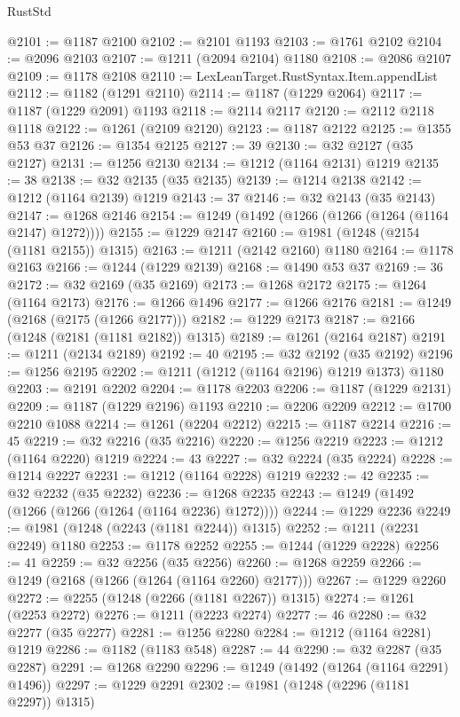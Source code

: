\begin{lexlean}{RustStd}
\begin{coremodule}
@2101 := @1187 @2100
@2102 := @2101 @1193
@2103 := @1761 @2102
@2104 := @2096 @2103
@2107 := @1211 (@2094 @2104) @1180
@2108 := @2086 @2107
@2109 := @1178 @2108
@2110 := LexLeanTarget.RustSyntax.Item.appendList
@2112 := @1182 (@1291 @2110)
@2114 := @1187 (@1229 @2064)
@2117 := @1187 (@1229 @2091) @1193
@2118 := @2114 @2117
@2120 := @2112 @2118 @1118
@2122 := @1261 (@2109 @2120)
@2123 := @1187 @2122
@2125 := @1355 @53 @37
@2126 := @1354 @2125
@2127 := 39
@2130 := @32 @2127 (@35 @2127)
@2131 := @1256 @2130
@2134 := @1212 (@1164 @2131) @1219
@2135 := 38
@2138 := @32 @2135 (@35 @2135)
@2139 := @1214 @2138
@2142 := @1212 (@1164 @2139) @1219
@2143 := 37
@2146 := @32 @2143 (@35 @2143)
@2147 := @1268 @2146
@2154 := @1249 (@1492 (@1266 (@1266 (@1264 (@1164 @2147) @1272))))
@2155 := @1229 @2147
@2160 := @1981 (@1248 (@2154 (@1181 @2155)) @1315)
@2163 := @1211 (@2142 @2160) @1180
@2164 := @1178 @2163
@2166 := @1244 (@1229 @2139)
@2168 := @1490 @53 @37
@2169 := 36
@2172 := @32 @2169 (@35 @2169)
@2173 := @1268 @2172
@2175 := @1264 (@1164 @2173)
@2176 := @1266 @1496
@2177 := @1266 @2176
@2181 := @1249 (@2168 (@2175 (@1266 @2177)))
@2182 := @1229 @2173
@2187 := @2166 (@1248 (@2181 (@1181 @2182)) @1315)
@2189 := @1261 (@2164 @2187)
@2191 := @1211 (@2134 @2189)
@2192 := 40
@2195 := @32 @2192 (@35 @2192)
@2196 := @1256 @2195
@2202 := @1211 (@1212 (@1164 @2196) @1219 @1373) @1180
@2203 := @2191 @2202
@2204 := @1178 @2203
@2206 := @1187 (@1229 @2131)
@2209 := @1187 (@1229 @2196) @1193
@2210 := @2206 @2209
@2212 := @1700 @2210 @1088
@2214 := @1261 (@2204 @2212)
@2215 := @1187 @2214
@2216 := 45
@2219 := @32 @2216 (@35 @2216)
@2220 := @1256 @2219
@2223 := @1212 (@1164 @2220) @1219
@2224 := 43
@2227 := @32 @2224 (@35 @2224)
@2228 := @1214 @2227
@2231 := @1212 (@1164 @2228) @1219
@2232 := 42
@2235 := @32 @2232 (@35 @2232)
@2236 := @1268 @2235
@2243 := @1249 (@1492 (@1266 (@1266 (@1264 (@1164 @2236) @1272))))
@2244 := @1229 @2236
@2249 := @1981 (@1248 (@2243 (@1181 @2244)) @1315)
@2252 := @1211 (@2231 @2249) @1180
@2253 := @1178 @2252
@2255 := @1244 (@1229 @2228)
@2256 := 41
@2259 := @32 @2256 (@35 @2256)
@2260 := @1268 @2259
@2266 := @1249 (@2168 (@1266 (@1264 (@1164 @2260) @2177)))
@2267 := @1229 @2260
@2272 := @2255 (@1248 (@2266 (@1181 @2267)) @1315)
@2274 := @1261 (@2253 @2272)
@2276 := @1211 (@2223 @2274)
@2277 := 46
@2280 := @32 @2277 (@35 @2277)
@2281 := @1256 @2280
@2284 := @1212 (@1164 @2281) @1219
@2286 := @1182 (@1183 @548)
@2287 := 44
@2290 := @32 @2287 (@35 @2287)
@2291 := @1268 @2290
@2296 := @1249 (@1492 (@1264 (@1164 @2291) @1496))
@2297 := @1229 @2291
@2302 := @1981 (@1248 (@2296 (@1181 @2297)) @1315)

\end{coremodule}
\end{lexlean}
